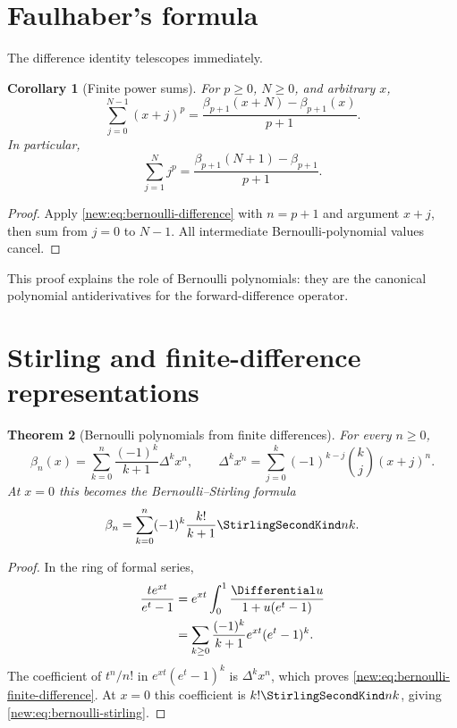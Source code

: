 \documentclass[11pt,a4paper,oneside,openany]{book}
\newtheorem{theorem}{Theorem}[chapter]
\newtheorem{corollary}[theorem]{Corollary}
\theoremstyle{definition}
\theoremstyle{remark}
\begin{document}
\section{Faulhaber's formula}

The difference identity telescopes immediately.

\begin{corollary}[Finite power sums]
For $p\ge0$, $N\ge0$, and arbitrary $x$,
\begin{equation}
 \sum_{j=0}^{N-1}(x+j)^p
 =\frac{\beta_{p+1}(x+N)-\beta_{p+1}(x)}{p+1}.
 \label{new:eq:faulhaber-bernoulli}
\end{equation}
In particular,
\begin{equation}
 \sum_{j=1}^{N}j^p
 =\frac{\beta_{p+1}(N+1)-\beta_{p+1}}{p+1}.
 \label{new:eq:faulhaber-standard}
\end{equation}
\end{corollary}

\begin{proof}
Apply \eqref{new:eq:bernoulli-difference} with $n=p+1$ and argument $x+j$,
then sum from $j=0$ to $N-1$.  All intermediate Bernoulli-polynomial values
cancel.
\end{proof}

This proof explains the role of Bernoulli polynomials: they are the canonical
polynomial antiderivatives for the forward-difference operator.

\section{Stirling and finite-difference representations}

\begin{theorem}[Bernoulli polynomials from finite differences]
For every $n\ge0$,
\begin{equation}
 \beta_n(x)=\sum_{k=0}^n\frac{(-1)^k}{k+1}\Delta^k x^n,
 \qquad
 \Delta^k x^n=\sum_{j=0}^k(-1)^{k-j}\binom kj(x+j)^n.
 \label{new:eq:bernoulli-finite-difference}
\end{equation}
At $x=0$ this becomes the Bernoulli--Stirling formula
\begin{equation}
 \beta_n=\sum_{k=0}^n(-1)^k\frac{k!}{k+1}\StirlingSecondKind nk.
 \label{new:eq:bernoulli-stirling}
\end{equation}
\end{theorem}

\begin{proof}
In the ring of formal series,
\begin{align*}
 \frac{te^{xt}}{e^t-1}
 &=e^{xt}\int_0^1\frac{\Differential u}{1+u(e^t-1)}\\
 &=\sum_{k\ge0}\frac{(-1)^k}{k+1}
   e^{xt}(e^t-1)^k.
\end{align*}
The coefficient of $t^n/n!$ in $e^{xt}(e^t-1)^k$ is $\Delta^kx^n$,
which proves \eqref{new:eq:bernoulli-finite-difference}.  At $x=0$ this
coefficient is $k!\StirlingSecondKind nk$, giving
\eqref{new:eq:bernoulli-stirling}.
\end{proof}
\end{document}
